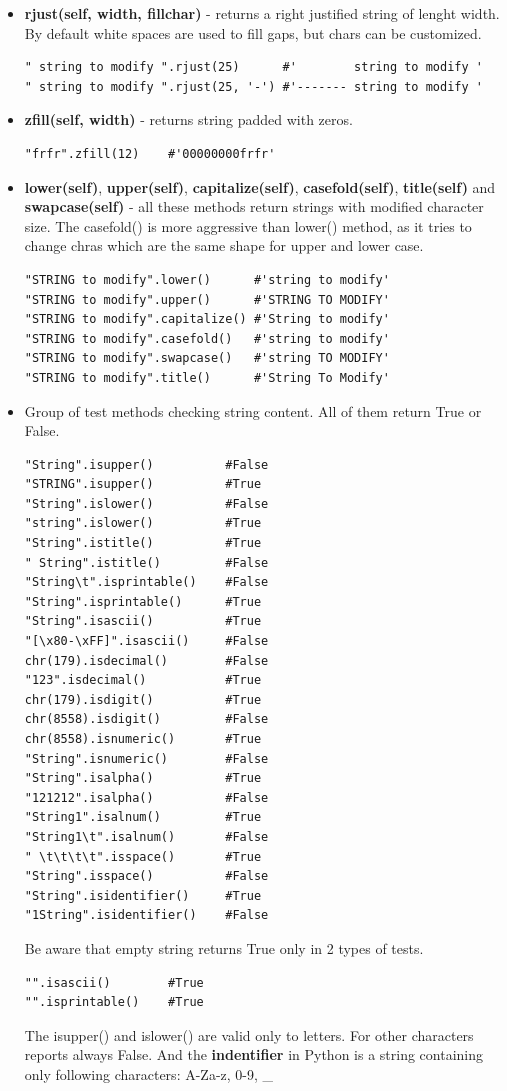 \documentclass{article}
\begin{document}
\begin{itemize}
\item \textbf{rjust(self, width, fillchar)} - returns a right justified string of lenght width. By default white spaces are used to fill gaps, but chars can be customized.
\begin{lstlisting}[style=pystyle]
" string to modify ".rjust(25)		#'        string to modify '
" string to modify ".rjust(25, '-')	#'------- string to modify '
\end{lstlisting}

\item \textbf{zfill(self, width)} - returns string padded with zeros.
\begin{lstlisting}[style=pystyle]
"frfr".zfill(12)	#'00000000frfr'
\end{lstlisting}

\item \textbf{lower(self)}, \textbf{upper(self)}, \textbf{capitalize(self)}, \textbf{casefold(self)}, \textbf{title(self)} and \textbf{swapcase(self)} - all these methods return strings with modified character size. The casefold() is more aggressive than lower() method, as it tries to change chras which are the same shape for upper and lower case.
\begin{lstlisting}[style=pystyle]
"STRING to modify".lower()		#'string to modify'
"STRING to modify".upper()		#'STRING TO MODIFY'
"STRING to modify".capitalize()	#'String to modify'
"STRING to modify".casefold()	#'string to modify'
"STRING to modify".swapcase()	#'string TO MODIFY'
"STRING to modify".title()		#'String To Modify'
\end{lstlisting}

\item Group of test methods checking string content. All of them return True or False.
\begin{lstlisting}[style=pystyle]
"String".isupper()			#False
"STRING".isupper()			#True
"String".islower()			#False
"string".islower()			#True
"String".istitle()			#True
" String".istitle()			#False
"String\t".isprintable()	#False
"String".isprintable()		#True
"String".isascii()			#True
"[\x80-\xFF]".isascii()		#False
chr(179).isdecimal()		#False
"123".isdecimal()			#True
chr(179).isdigit()			#True
chr(8558).isdigit()			#False
chr(8558).isnumeric()		#True
"String".isnumeric()		#False
"String".isalpha()			#True
"121212".isalpha()			#False
"String1".isalnum()			#True
"String1\t".isalnum()		#False
" \t\t\t\t".isspace()		#True
"String".isspace()			#False
"String".isidentifier()		#True
"1String".isidentifier()	#False
\end{lstlisting}
Be aware that empty string returns True only in 2 types of tests.
\begin{lstlisting}[style=pystyle]
"".isascii()		#True
"".isprintable()	#True
\end{lstlisting}
The isupper() and islower() are valid only to letters. For other characters reports always False.
And the \textbf{indentifier} in Python is a string containing only following characters: A-Za-z, 0-9, \_


\end{itemize}
\end{document}
